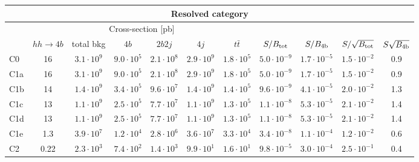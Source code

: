 \begin{tabular}{|l|cc|cccc|cccc|}
  \hline
\multicolumn{11}{|c|}{Resolved category}\\
\hline
&  \multicolumn{6}{c|}{Cross-section [pb]} &  &  & &  \\
   &  $hh\to 4b$ &  total bkg  &   $4b$    &  $2b2j$   &   $4j$    &
$t\bar{t}$ &
$S/B_{\rm tot}$ & $S/B_{\rm 4b}$ & $S/\sqrt{B_{\rm tot}}$ & $S\sqrt{B_{\rm 4b}}$ \\
  \hline
  \hline
 C0    & 16  &   $3.1\cdot 10^9$   & $9.0\cdot 10^5$ & $2.1\cdot 10^8$ & $2.9\cdot 10^9$ & $1.8\cdot 10^5$ &   $5.0\cdot 10^{-9}$   & $1.7\cdot 10^{-5}$ &   $1.5\cdot 10^{-2}$   & 0.9 \\
 C1a   & 16  &   $3.1\cdot 10^9$   & $9.0\cdot 10^5$ & $2.1\cdot 10^8$ & $2.9\cdot 10^9$ & $1.8\cdot 10^5$ &   $5.0\cdot 10^{-9}$   & $1.7\cdot 10^{-5}$  &   $1.5\cdot 10^{-2}$   & 0.9 \\
 C1b   & 14  &   $1.4\cdot 10^9$   & $3.4\cdot 10^5$ & $9.6\cdot 10^7$ & $1.4\cdot 10^9$ & $1.4\cdot 10^5$  &   $9.6\cdot 10^{-9}$   & $4.1\cdot 10^{-5}$ &   $2.0\cdot 10^{-2}$   & 1.3\\
 C1c   & 13  &   $1.1\cdot 10^9$   & $2.5\cdot 10^5$ & $7.7\cdot 10^7$ & $1.1\cdot 10^9$ & $1.3\cdot 10^5$ &   $1.1\cdot 10^{-8}$   & $5.3\cdot 10^{-5}$  &   $2.1\cdot 10^{-2}$   & 1.4  \\
 C1d   & 13 &   $1.1\cdot 10^9 $  & $2.5\cdot 10^5$ & $7.7\cdot 10^7$ & $1.1\cdot 10^9$ & $1.3\cdot 10^5$  &   $1.1\cdot 10^{-8}$   & $5.3\cdot 10^{-5}$  &   $2.1\cdot 10^{-2}$   & 1.4\\
 C1e   & 1.3  &   $3.9\cdot 10^7$   & $1.2\cdot 10^4$ & $2.8\cdot 10^6$ & $3.6\cdot 10^7$ & $3.3\cdot 10^4$  &   $3.4\cdot 10^{-8}$   & $1.1\cdot 10^{-4}$ &   $1.2\cdot 10^{-2}$   & 0.6\\
 C2    & 0.22  &   $2.3\cdot 10^3$   & $7.4\cdot 10^2$ & $1.4\cdot 10^3$ & $9.9\cdot 10^1$ & $1.6\cdot 10^1$  &   $9.8\cdot 10^{-5}$   & $3.0\cdot 10^{-4}$  &  $ 2.5\cdot 10^{-1}$   & 0.4 \\
\hline
\end{tabular}
